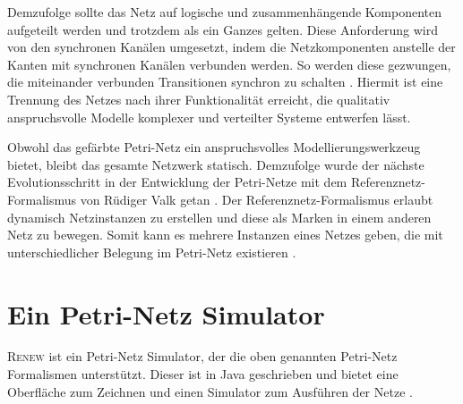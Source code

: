 	Demzufolge sollte das Netz auf logische und zusammenhängende Komponenten aufgeteilt werden und trotzdem als ein Ganzes gelten. Diese Anforderung wird von den synchronen Kanälen umgesetzt, indem die Netzkomponenten anstelle der Kanten mit synchronen Kanälen verbunden werden. So werden diese gezwungen, die miteinander verbunden Transitionen synchron zu schalten \cite{Kummer02}. Hiermit ist eine Trennung des Netzes nach ihrer Funktionalität erreicht, die qualitativ anspruchsvolle Modelle komplexer und verteilter Systeme entwerfen lässt.\bigbreak

	Obwohl das gefärbte Petri-Netz ein anspruchsvolles Modellierungswerkzeug bietet, bleibt das gesamte Netzwerk statisch. Demzufolge wurde der nächste Evolutionsschritt in der Entwicklung der Petri-Netze mit dem Referenznetz-Formalismus von Rüdiger Valk getan \cite{Valk09}. Der Referenznetz-Formalismus erlaubt dynamisch Netzinstanzen zu erstellen und diese als Marken in einem anderen Netz zu bewegen. Somit kann es mehrere Instanzen eines Netzes geben, die mit unterschiedlicher Belegung im Petri-Netz existieren \cite{Kummer02}.

\section{Ein Petri-Netz Simulator} \label{sec:EPS}

	\textsc{Renew} ist ein Petri-Netz Simulator, der die oben genannten Petri-Netz Formalismen unterstützt. Dieser ist in Java geschrieben und bietet eine Oberfläche zum Zeichnen und einen Simulator zum Ausführen der Netze \cite{Kummer+99a}.\bigbreak

